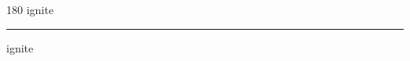 
\begin{frame}
\begin{center}
\begin{turn}{180}
{\fontsize{2.5cm}{1em}\selectfont ignite}
\end{turn}
\vspace{1em}\par  
\hrule
\vspace{1em}\par  
{\fontsize{2.5cm}{1em}\selectfont ignite}
\end{center}
\end{frame}
